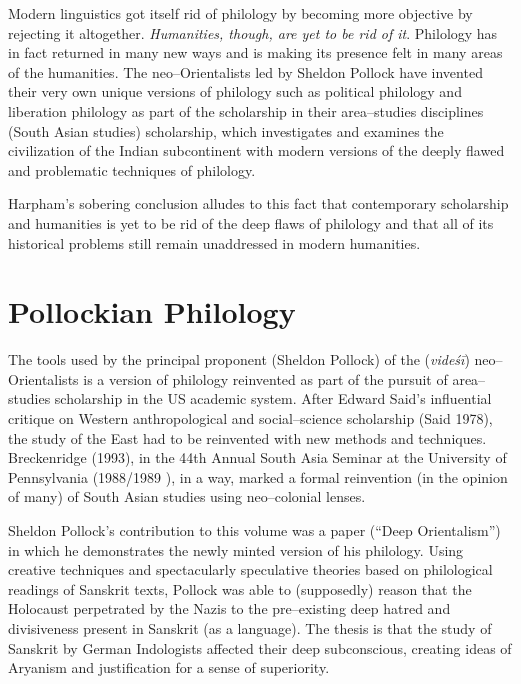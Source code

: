 Modern linguistics got itself rid of philology by becoming more objective by rejecting it altogether. \textit{Humanities, though, are yet to be rid of it}. Philology has in fact returned in many new ways and is making its presence felt in many areas of the humanities. The neo–Orientalists led by Sheldon Pollock have invented their very own unique versions of philology such as political philology and liberation philology as part of the scholarship in their area–studies disciplines (South Asian studies) scholarship, which investigates and examines the civilization of the Indian subcontinent with modern versions of the deeply flawed and problematic techniques of philology.

Harpham’s sobering conclusion alludes to this fact that contemporary scholarship and humanities is yet to be rid of the deep flaws of philology and that all of its historical problems still remain unaddressed in modern humanities.


\section*{Pollockian Philology}

The tools used by the principal proponent (Sheldon Pollock) of the (\textit{videśī}) neo–Orientalists is a version of philology reinvented as part of the pursuit of area–studies scholarship in the US academic system. After Edward Said’s influential critique on Western anthropological and social–science scholarship (Said 1978), the study of the East had to be reinvented with new methods and techniques. Breckenridge (1993), in the 44th Annual South Asia Seminar at the University of Pennsylvania (1988/1989 ), in a way, marked a formal reinvention (in the opinion of many) of South Asian studies using neo–colonial lenses.

\newpage

Sheldon Pollock’s contribution to this volume was a paper (“Deep Orientalism”) in which he demonstrates the newly minted version of his philology. Using creative techniques and spectacularly speculative theories based on philological readings of Sanskrit texts, Pollock was able to (supposedly) reason that the Holocaust perpetrated by the Nazis to the pre–existing deep hatred and divisiveness present in Sanskrit (as a language). The thesis is that the study of Sanskrit by German Indologists affected their deep subconscious, creating ideas of Aryanism and justification for a sense of superiority.

